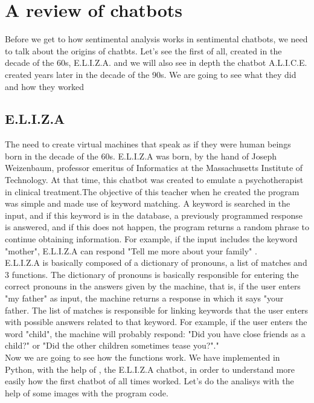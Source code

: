 \documentclass[12pt,twoside]{article}
\theoremstyle{plain}
\theoremstyle{definition}
\theoremstyle{remark}
\begin{document}
 


\section{A review of chatbots}
\label{sec:basics}
Before we get to how sentimental analysis works in sentimental chatbots, we need to talk about the origins of chatbts. Let's see the first of all, created in the decade of the 60s, E.L.I.Z.A. and we will also see in depth the chatbot A.L.I.C.E. created years later in the decade of the 90s. We are going to see what they did and how they worked

\subsection{E.L.I.Z.A}
	\label{sec:E.L.I.Z.A}
The need to create virtual machines that speak as if they were human beings born in the decade of the 60s. E.L.I.Z.A was born, by the hand of Joseph Weizenbaum, professor emeritus of Informatics at the Massachusetts Institute of Technology. At that time, this chatbot was created to emulate a psychotherapist in clinical treatment.The objective of this teacher when he created the program was simple and made use of keyword matching. A keyword is searched in the input, and if this keyword is in the database, a previously programmed response is answered, and if this does not happen, the program returns a random phrase to continue obtaining information. For example, if the input includes the keyword "mother", E.L.I.Z.A can respond "Tell me more about your family" \cite{shawar2007chatbots}.\\

E.L.I.Z.A is basically composed of a dictionary of pronouns, a list of matches and 3 functions.\cite{joseph1966E.L.I.Z.A} The dictionary of pronouns is basically responsible for entering the correct pronouns in the answers given by the machine, that is, if the user enters "my father" as input, the machine returns a response in which it says "your father. The list of matches is responsible for linking keywords that the user enters with possible answers related to that keyword. For example, if the user enters the word "child", the machine will probably respond: "Did you have close friends as a child?" or "Did the other children sometimes tease you?"."\cite{joseph1966E.L.I.Z.A}\\

Now we are going to see how the functions work. We have implemented in Python, with the help of \cite{small2017}, the E.L.I.Z.A chatbot, in order to understand more easily how the first chatbot of all times worked. Let's do the analisys with the help of some images with the program code.\\
\end{document}

